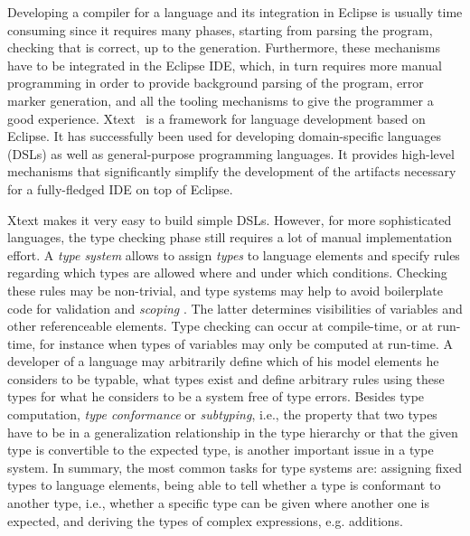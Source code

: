 
Developing a compiler for a language  and its integration in Eclipse is
usually time consuming since it requires many phases, starting from parsing the
program, checking that is correct, up to the generation. Furthermore, these
mechanisms have to be integrated in the Eclipse IDE, which, in turn requires
more manual programming in order to provide background parsing of the program,
error marker generation, and all the tooling mechanisms to give the programmer a
good experience.  Xtext~\cite{xtext} is a
framework for language development based on Eclipse. It has successfully been
used for developing domain-specific languages (DSLs) as well as general-purpose
programming languages. It provides high-level mechanisms that significantly
simplify the development of the artifacts necessary for a fully-fledged IDE on
top of Eclipse.

Xtext makes it very easy to build simple DSLs. However, for more sophisticated
languages, the type checking phase still requires a lot of manual implementation
effort. A \emph{type system} allows to assign \emph{types} to language elements
and specify rules regarding which types are allowed where and under which
conditions. Checking these rules may be non-trivial, and type systems may help
to avoid boilerplate code for validation and \emph{scoping} .
The latter determines visibilities of variables and other referenceable
elements.  Type checking can
occur at compile-time, or at run-time, for instance when types of variables may
only be computed at run-time.  A developer of a language may
arbitrarily define which of his model elements he considers to be typable, what
types exist and define arbitrary rules using these types for what he considers
to be a system free of type errors.
Besides type computation, \emph{type conformance} or \emph{subtyping}, i.e., the
property that two types have to be in a generalization relationship in the type
hierarchy or that the given type is convertible to the expected type, is another
important issue in a type system.
In summary, the most common tasks for type systems are:
assigning fixed types to language elements, being able to tell whether a type is
conformant to another type, i.e., whether a specific type can be given where
another one is expected, and deriving the types of complex expressions, e.g.
additions.

